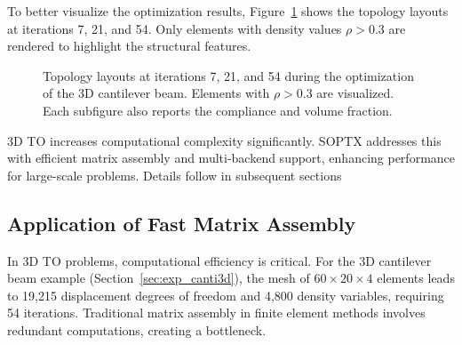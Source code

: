 \documentclass[mathpazo]{cicp}
\begin{document}
To better visualize the optimization results, Figure~\ref{fig:canti3d_all} shows the topology layouts at iterations 7, 21, and 54. Only elements with density values $\rho>0.3$ are rendered to highlight the structural features.
\vspace{-2ex} %
\begin{figure}[htp]
	\centering
	\caption{Topology layouts at iterations 7, 21, and 54 during the optimization of the 3D cantilever beam. Elements with $\rho > 0.3$ are visualized. Each subfigure also reports the compliance and volume fraction.}
	\label{fig:canti3d_all}
\end{figure}
\vspace{-2ex} %

3D TO increases computational complexity significantly. SOPTX addresses this with efficient matrix assembly and multi-backend support, enhancing performance for large-scale problems. Details follow in subsequent sections

\subsection{Application of Fast Matrix Assembly}
In 3D TO problems, computational efficiency is critical. For the 3D cantilever beam example (Section~\ref{sec:exp_canti3d}), the mesh of $60\times20\times4$ elements leads to 19,215 displacement degrees of freedom and 4,800 density variables, requiring 54 iterations. Traditional matrix assembly in finite element methods involves redundant computations, creating a bottleneck.
\end{document}
